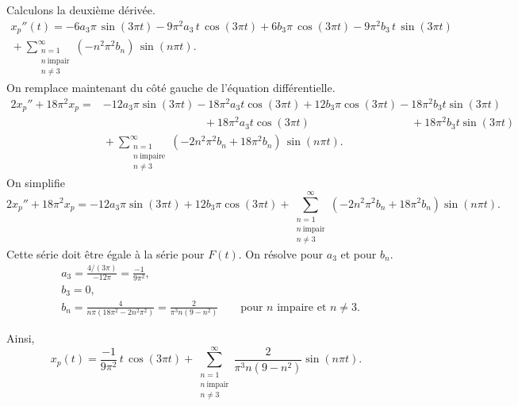 \begin{example}
Calculons la deuxième dérivée.
\begin{multline*}
x_p''(t) =
- 6 a_3
\pi \, \sin (3 \pi t) - 9\pi^2 a_3 \, t \, \cos (3 \pi t)
+
6 b_3
\pi \, \cos (3 \pi t) - 9\pi^2 b_3 \, t \, \sin (3 \pi t)
\\
{} +
\sum_{\substack{n=1 \\ n~\text{impair} \\ n\not= 3}}^\infty
(-n^2 \pi^2 b_n ) \,
\sin (n \pi t) . 
\end{multline*}
On remplace maintenant du côté gauche de l'équation différentielle.
\begin{align*}
2x_p'' + 18\pi^2 x_p 
= & 
- 12 a_3 \pi \sin (3 \pi t)
- 18\pi^2 a_3 t \cos (3 \pi t)
+ 12 b_3 \pi \cos (3 \pi t)
- 18\pi^2 b_3 t \sin (3 \pi t)
\\
& \phantom{\, - 12 a_3 \pi \sin (3 \pi t)} ~
{} + 18 \pi^2 a_3 t \cos (3 \pi t)
\phantom{\, + 12 b_3 \pi \cos (3 \pi t)} ~
{} + 18 \pi^2 b_3 t \sin (3 \pi t)
\\
& {} + \sum_{\substack{n=1 \\ n~\text{impaire} \\ n\not= 3}}^\infty
(-2n^2 \pi^2 b_n + 18\pi^2 b_n) \,
\sin (n \pi t) . 
\end{align*}
On simplifie
\begin{equation*}
2x_p'' + 18\pi^2 x_p =
- 12 a_3
\pi \sin (3 \pi t)
+
12 b_3
\pi \cos (3 \pi t)
+
\sum_{\substack{n=1 \\ n~\text{impair} \\ n\not= 3}}^\infty
(-2n^2 \pi^2 b_n + 18\pi^2 b_n)
\sin (n \pi t) . 
\end{equation*}
Cette série doit être égale à la série pour $F(t)$.
On résolve pour $a_3$ et pour $b_n$.
\begin{align*}
& a_3 = \frac{4/(3\pi)}{-12\pi} = \frac{-1}{9\pi^2} , \\
& b_3 = 0 , \\
& b_n = \frac{4}{n\pi(18\pi^2 - 2n^2 \pi^2)} 
= \frac{2}{\pi^3 n(9 - n^2)} \qquad \text{pour } n \text{ impaire et } n\not=3 .
\end{align*}

Ainsi,
\begin{equation*}
x_p(t) =
\frac{-1}{9\pi^2}
\,
t \, \cos (3 \pi t)
+
\sum_{\substack{n=1 \\ n~\text{impair} \\ n\not= 3}}^\infty
\frac{2}{\pi^3 n(9 - n^2)}
\sin (n \pi t) . 
\end{equation*}
\end{example}

